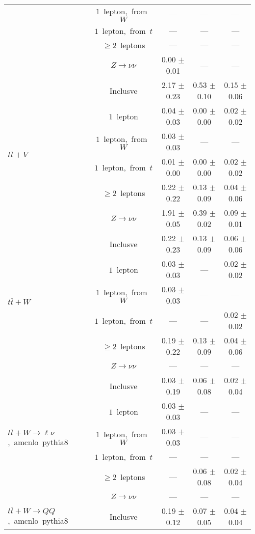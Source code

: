 \documentclass{article}
\begin{document}
\begin{longtable}{|l|c|c|c|c|}
 & $1$~lepton,~from~$W$  & ---  & ---  & --- \\* 
 & $1$~lepton,~from~$t$  & ---  & ---  & --- \\* 
 & $\ge2$~leptons  & ---  & ---  & --- \\* 
 & $Z\rightarrow\nu\nu$  & 0.00 $\pm$ 0.01  & ---  & --- \\* 
\hline 
\multirow{6}{*}{$t\bar{t}+V$} & Inclusve  & 2.17 $\pm$ 0.23  & 0.53 $\pm$ 0.10  & 0.15 $\pm$ 0.06 \\* 
 & $1$~lepton  & 0.04 $\pm$ 0.03  & 0.00 $\pm$ 0.00  & 0.02 $\pm$ 0.02 \\* 
 & $1$~lepton,~from~$W$  & 0.03 $\pm$ 0.03  & ---  & --- \\* 
 & $1$~lepton,~from~$t$  & 0.01 $\pm$ 0.00  & 0.00 $\pm$ 0.00  & 0.02 $\pm$ 0.02 \\* 
 & $\ge2$~leptons  & 0.22 $\pm$ 0.22  & 0.13 $\pm$ 0.09  & 0.04 $\pm$ 0.06 \\* 
 & $Z\rightarrow\nu\nu$  & 1.91 $\pm$ 0.05  & 0.39 $\pm$ 0.02  & 0.09 $\pm$ 0.01 \\* 
\hline 
\multirow{6}{*}{$t\bar{t}+W$} & Inclusve  & 0.22 $\pm$ 0.23  & 0.13 $\pm$ 0.09  & 0.06 $\pm$ 0.06 \\* 
 & $1$~lepton  & 0.03 $\pm$ 0.03  & ---  & 0.02 $\pm$ 0.02 \\* 
 & $1$~lepton,~from~$W$  & 0.03 $\pm$ 0.03  & ---  & --- \\* 
 & $1$~lepton,~from~$t$  & ---  & ---  & 0.02 $\pm$ 0.02 \\* 
 & $\ge2$~leptons  & 0.19 $\pm$ 0.22  & 0.13 $\pm$ 0.09  & 0.04 $\pm$ 0.06 \\* 
 & $Z\rightarrow\nu\nu$  & ---  & ---  & --- \\* 
\hline 
\multirow{6}{*}{$t\bar{t}+W{\rightarrow}{\ell}{\nu}$,~amcnlo~pythia8} & Inclusve  & 0.03 $\pm$ 0.19  & 0.06 $\pm$ 0.08  & 0.02 $\pm$ 0.04 \\* 
 & $1$~lepton  & 0.03 $\pm$ 0.03  & ---  & --- \\* 
 & $1$~lepton,~from~$W$  & 0.03 $\pm$ 0.03  & ---  & --- \\* 
 & $1$~lepton,~from~$t$  & ---  & ---  & --- \\* 
 & $\ge2$~leptons  & ---  & 0.06 $\pm$ 0.08  & 0.02 $\pm$ 0.04 \\* 
 & $Z\rightarrow\nu\nu$  & ---  & ---  & --- \\* 
\hline 
\multirow{6}{*}{$t\bar{t}+W{\rightarrow}QQ$,~amcnlo~pythia8} & Inclusve  & 0.19 $\pm$ 0.12  & 0.07 $\pm$ 0.05  & 0.04 $\pm$ 0.04 \\* 

\end{longtable}
\end{document}
